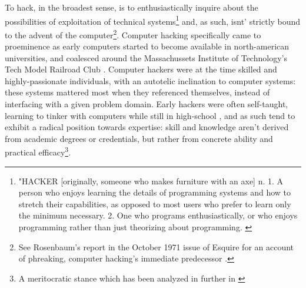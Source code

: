 To hack, in the broadest sense, is to enthusiastically inquire about the possibilities of exploitation of technical systems\footnote{"HACKER [originally, someone who makes furniture with an axe] n. 1. A person who enjoys learning the details of programming systems and how to stretch their capabilities, as opposed to most users who prefer to learn only the minimum necessary. 2. One who programs enthusiastically, or who enjoys programming rather than just theorizing about programming. \citep{dourish_original_1988}} and, as such, isnt' strictly bound to the advent of the computer\footnote{See Rosenbaum's report in the October 1971 issue of Esquire for an account of phreaking, computer hacking's immediate predecessor \citep{rosenbaum_secrets_2004}.}. Computer hacking specifically came to proeminence as early computers started to become available in north-american universities, and coalesced around the Massachussets Institute of Technology's Tech Model Railroad Club \citep{levy_hackers_2010}. Computer hackers were at the time skilled and highly-passionate individuals, with an autotelic inclination to computer systems: these systems mattered most when they referenced themselves, instead of interfacing with a given problem domain. Early hackers were often self-taught, learning to tinker with computers while still in high-school \citep{lammers_programmers_1986}, and as such tend to exhibit a radical position towards expertise: skill and knowledge aren't derived from academic degrees or credentials, but rather from concrete ability and practical efficacy\footnote{A meritocratic stance which has been analyzed in further in  \citep{coleman_aesthetics_2018}}.

